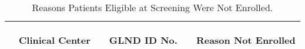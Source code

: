 \documentclass[dvips, 10pt]{article}
\begin{document}
\clearpage
\begin{table}[t]
\caption
{ Reasons Patients Eligible at Screening Were Not Enrolled. }
\begin{center}
\begin{tabular}{ @{}l@{}
@{}l@{}@{}p{1.5em}@{}@{}c@{}@{}p{1.5em}@{}@{}l@{}
}
\hline

& \parbox{6em}{\begin{center}Clinical Center\end{center}} && \parbox{6em}{\begin{center}GLND ID No.\end{center}} && \parbox{6em}{\begin{center}Reason Not Enrolled\end{center}} \\

\hline


\end{tabular}
\end{center}
\end{table}
\end{document}
